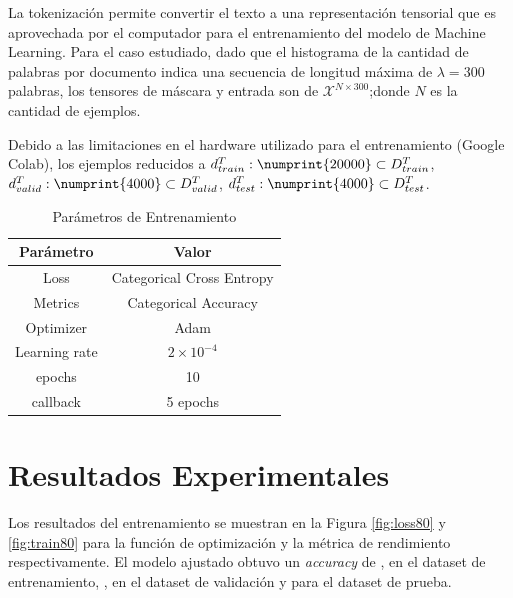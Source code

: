 \documentclass[onecolumn, journal, english, 12pt, a4paper]{IEEEtran} %
\theoremstyle{definition}
\begin{document}
La tokenización permite convertir el texto a una representación tensorial que es aprovechada por el computador para el entrenamiento del modelo de Machine Learning. Para el caso estudiado, dado que el histograma de la cantidad de palabras por documento indica una secuencia de longitud máxima de $\lambda = 300$ palabras, los tensores de máscara y entrada son de $\mathbf{\mathcal{X}}^{N\times300}$;donde $N$ es la cantidad de ejemplos.

Debido a las limitaciones en el hardware utilizado para el entrenamiento (Google Colab), los ejemplos reducidos a $d^T_{train}:\numprint{20000} \subset D^T_{train}$, $d^T_{valid}:\numprint{4000} \subset D^T_{valid}$, $d^T_{test}:\numprint{4000} \subset D^T_{test}$.

\begin{table}[!t]
\renewcommand{\arraystretch}{1.3}
\caption{Parámetros de Entrenamiento}
\label{tab:trainingParam}
\centering
\begin{tabular}{cc}
\hline
Parámetro & Valor\\
\hline
 Loss & Categorical Cross Entropy\\
Metrics & Categorical Accuracy \\
Optimizer & Adam \\
Learning rate & $2 \times 10^{-4}$ \\
epochs & 10 \\
callback & 5 epochs \\
\hline
\end{tabular}
\end{table}

\section{Resultados Experimentales}\label{chap:resultados}
Los resultados del entrenamiento se muestran en la Figura \ref{fig:loss80} y \ref{fig:train80} para la función de optimización y la métrica de rendimiento respectivamente. El modelo ajustado obtuvo un \emph{accuracy} de , en el dataset de entrenamiento, , en el dataset de validación y  para el dataset de prueba. 
\end{document}
